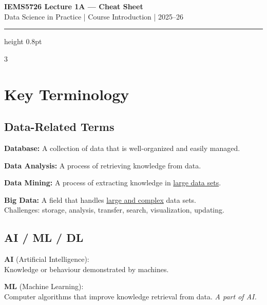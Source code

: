 \documentclass[a4paper,7pt]{extarticle}
\begin{document}
\begin{center}
  {\fontsize{11}{13}\selectfont\bfseries\color{secblue} IEMS5726 Lecture 1A --- Cheat Sheet}\\[1pt]
  {\fontsize{6.5}{7}\selectfont\color{gray} Data Science in Practice | Course Introduction | 2025--26}
\end{center}
\vspace{-2pt}
{\color{secblue}\hrule height 0.8pt}
\vspace{3pt}

\begin{multicols}{3}

\section{Key Terminology}

\subsection{Data-Related Terms}

\begin{defbox}[Definitions]
\textbf{Database:} A collection of data that is well-organized and easily managed.

\textbf{Data Analysis:} A process of retrieving knowledge from data.

\textbf{Data Mining:} A process of extracting knowledge in \underline{large data sets}.

\textbf{Big Data:} A field that handles \underline{large and complex} data sets.\\
Challenges: storage, analysis, transfer, search, visualization, updating.
\end{defbox}

\subsection{AI / ML / DL}

\begin{infobox}
\textbf{AI} (Artificial Intelligence):\\
Knowledge or behaviour demonstrated by machines.

\textbf{ML} (Machine Learning):\\
Computer algorithms that improve knowledge retrieval from data. \textit{A part of AI.}


\end{infobox}
\end{multicols}
\end{document}
